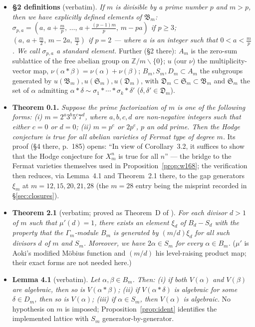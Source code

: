 \documentclass[11pt]{amsart}
\theoremstyle{remark}
\newcommand{\Z}{\mathbb{Z}}
\newcommand{\V}{V}
\begin{document}
\begin{itemize}
\item[--] \textbf{\S2 definitions} (verbatim). \emph{If $m$ is divisible by a prime number $p$
and $m>p$, then we have explicitly defined elements of $\mathfrak B_m$:
$\sigma_{p,a}=(a,\,a+\frac mp,\,\dots,\,a+\frac{(p-1)m}p,\,m-pa)$ if $p\ge3$;
$(a,\,a+\frac m2,\,m-2a,\,\frac m2)$ if $p=2$ --- where $a$ is an integer such that
$0<a<\frac mp$. We call $\sigma_{p,a}$ a standard element.} Further (\S2 there): $A_m$ is the
zero-sum sublattice of the free abelian group on $\Z/m\smallsetminus\{0\}$; $u$ (our $\nu$) the
multiplicity-vector map, $\nu(\alpha*\beta)=\nu(\alpha)+\nu(\beta)$; $B_m,S_m,D_m\subset A_m$ the
subgroups generated by $u(\mathfrak B_m),u(\mathfrak S_m),u(\mathfrak D_m)$, with
$\mathfrak D_m\subset\mathfrak S_m\subset\mathfrak B_m$ and $\mathfrak S_m$ the set of $\alpha$
admitting $\alpha*\delta\sim\sigma_1*\cdots*\sigma_k*\delta'$ ($\delta,\delta'\in\mathfrak
D_m$).
\item[--] \textbf{Theorem 0.1.} \emph{Suppose the prime factorization of $m$ is one of the
following forms: (i) $m=2^a3^b5^c7^d$, where $a,b,c,d$ are non-negative integers such that either
$c=0$ or $d=0$; (ii) $m=p^e$ or $2p^e$, $p$ an odd prime. Then the Hodge conjecture is true for
all abelian varieties of Fermat type of degree $m$.} Its proof (\S4 there, p.~185) opens: ``In view of
Corollary~3.2, it suffices to show that the Hodge conjecture for $X^n_m$ is true for all $n$'' ---
the bridge to the Fermat varieties themselves used in Proposition~\ref{prop:w168}; the
verification then reduces, via Lemma~4.1 and Theorem~2.1 there, to the gap generators $\xi_m$ at
$m=12,15,20,21,28$ (the $m=28$ entry being the misprint recorded in \S\ref{sec:closures}).
\item[--] \textbf{Theorem 2.1} (verbatim; proved as Theorem~D of \cite{AokiD}). \emph{For each
divisor $d>1$ of $m$ such that $\mu'(d)=1$, there exists an element $\xi_d$ of $B_d-S_d$ with
the property that the $\Gamma_m$-module $B_m$ is generated by $(m/d)\xi_d$ for all such divisors
$d$ of $m$ and $S_m$. Moreover, we have $2\alpha\in S_m$ for every $\alpha\in B_m$.} ($\mu'$ is
Aoki's modified M\"obius function and $(m/d)$ his level-raising product map; their exact forms
are not needed here.)
\item[--] \textbf{Lemma 4.1} (verbatim). \emph{Let $\alpha,\beta\in B_m$. Then:
(i) if both $\V(\alpha)$ and $\V(\beta)$ are algebraic, then so is $\V(\alpha*\beta)$;
(ii) if $\V(\alpha*\delta)$ is algebraic for some $\delta\in D_m$, then so is $\V(\alpha)$;
(iii) if $\alpha\in S_m$, then $\V(\alpha)$ is algebraic.} No hypothesis on $m$ is imposed;
Proposition~\ref{prop:ident} identifies the implemented lattice with $S_m$
generator-by-generator.
\end{itemize}
\end{document}
